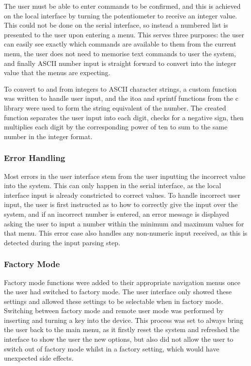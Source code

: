 \documentclass[]{report}
\begin{document}
The user must be able to enter commands to be confirmed, and this is achieved on the local interface by turning the potentiometer to receive an integer value. This could not be done on the serial interface, so instead a numbered list is presented to the user upon entering a menu. This serves three purposes: the user can easily see exactly which commands are available to them from the current menu, the user does not need to memorise text commands to user the system, and finally ASCII number input is straight forward to convert into the integer value that the menus are expecting. 

To convert to and from integers to ASCII character strings, a custom function was written to handle user input, and the itoa and sprintf functions from the c library were used to form the string equivalent of the number. The created function separates the user input into each digit, checks for a negative sign, then multiplies each digit by the corresponding power of ten to sum to the same number in the integer format.

\subsubsection{Error Handling}
Most errors in the user interface stem from the user inputting the incorrect value into the system. This can only happen in the serial interface, as the local interface input is already constricted to correct values. To handle incorrect user input, the user is first instructed as to how to correctly give the input over the system, and if an incorrect number is entered, an error message is displayed asking the user to input a number within the minimum and maximum values for that menu. This error case also handles any non-numeric input received, as this is detected during the input parsing step. 

\subsubsection{Factory Mode}
Factory mode functions were added to their appropriate navigation menus once the user had switched to factory mode. The user interface only showed these settings and allowed these settings to be selectable when in factory mode. Switching between factory mode and remote user mode was performed by inserting and turning a key into the device. This process was set to always bring the user back to the main menu, as it firstly reset the system and refreshed the interface to show the user the new options, but also  did not allow the user to switch out of factory mode whilst in a factory setting, which would have unexpected side effects.
\end{document}

